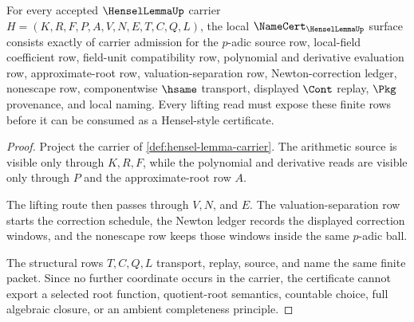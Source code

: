 \begin{theorem}
\label{thm:hensel-lemma-namecert-obligations}
For every accepted $\HenselLemmaUp$ carrier $H=(K,R,F,P,A,V,N,E,T,C,Q,L)$, the local $\NameCert_{\HenselLemmaUp}$ surface consists exactly of carrier admission for the $p$-adic source row, local-field coefficient row, field-unit compatibility row, polynomial and derivative evaluation row, approximate-root row, valuation-separation row, Newton-correction ledger, nonescape row, componentwise $\hsame$ transport, displayed $\Cont$ replay, $\Pkg$ provenance, and local naming. Every lifting read must expose these finite rows before it can be consumed as a Hensel-style certificate.
\end{theorem}
\begin{proof}
Project the carrier of \autoref{def:hensel-lemma-carrier}. The arithmetic source is visible only through $K,R,F$, while the polynomial and derivative reads are visible only through $P$ and the approximate-root row $A$.

The lifting route then passes through $V,N$, and $E$. The valuation-separation row starts the correction schedule, the Newton ledger records the displayed correction windows, and the nonescape row keeps those windows inside the same $p$-adic ball.

The structural rows $T,C,Q,L$ transport, replay, source, and name the same finite packet. Since no further coordinate occurs in the carrier, the certificate cannot export a selected root function, quotient-root semantics, countable choice, full algebraic closure, or an ambient completeness principle.
\end{proof}

